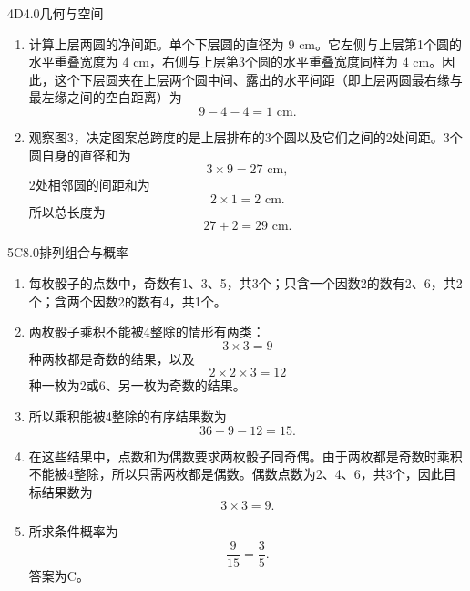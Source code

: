 \begin{solution}{4}{D}{4.0}{几何与空间}
\begin{enumerate}[label=\textbf{Step \arabic*:},leftmargin=*]
  \item 计算上层两圆的净间距。单个下层圆的直径为 \(9\text{ cm}\)。它左侧与上层第1个圆的水平重叠宽度为 \(4\text{ cm}\)，右侧与上层第3个圆的水平重叠宽度同样为 \(4\text{ cm}\)。因此，这个下层圆夹在上层两个圆中间、露出的水平间距（即上层两圆最右缘与最左缘之间的空白距离）为
  \[
    9-4-4=1\text{ cm}.
  \]
  \item 观察图3，决定图案总跨度的是上层排布的3个圆以及它们之间的2处间距。3个圆自身的直径和为
  \[
    3\times9=27\text{ cm},
  \]
  2处相邻圆的间距和为
  \[
    2\times1=2\text{ cm}.
  \]
  所以总长度为
  \[
    27+2=29\text{ cm}.
  \]
\end{enumerate}
\end{solution}

\begin{solution}{5}{C}{8.0}{排列组合与概率}
\begin{enumerate}[label=\textbf{Step \arabic*:},leftmargin=*]
  \item 每枚骰子的点数中，奇数有1、3、5，共3个；只含一个因数2的数有2、6，共2个；含两个因数2的数有4，共1个。
  \item 两枚骰子乘积不能被4整除的情形有两类：
  \[
    3\times3=9
  \]
  种两枚都是奇数的结果，以及
  \[
    2\times2\times3=12
  \]
  种一枚为2或6、另一枚为奇数的结果。
  \item 所以乘积能被4整除的有序结果数为
  \[
    36-9-12=15.
  \]
  \item 在这些结果中，点数和为偶数要求两枚骰子同奇偶。由于两枚都是奇数时乘积不能被4整除，所以只需两枚都是偶数。偶数点数为2、4、6，共3个，因此目标结果数为
  \[
    3\times3=9.
  \]
  \item 所求条件概率为
  \[
    \frac9{15}=\frac35.
  \]
  答案为C。
\end{enumerate}
\end{solution}

